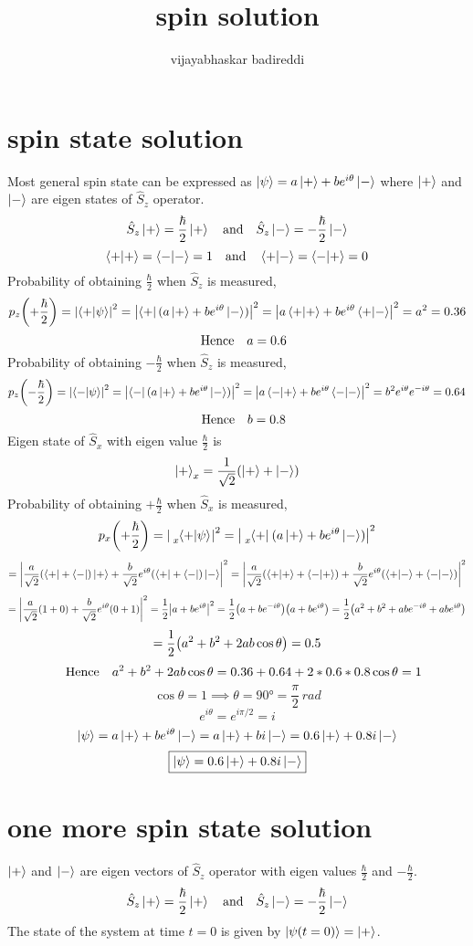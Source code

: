 \documentclass[12pt]{article}
\title{spin solution}
\author{vijayabhaskar badireddi}
\begin{document}
\section*{spin state solution}
Most general spin state can be expressed as $\ket{\psi}=a\ket{+}+be^{i\theta}\ket{-}$ where $\ket{+}$ and $\ket{-}$ are eigen states of $\hat{S}_z$ operator.
\[\hat{S}_z\ket{+}=\frac{\hbar}{2}\ket{+}\qq{and}\hat{S}_z\ket{-}=-\frac{\hbar}{2}\ket{-}\]
\[\braket{+}{+}=\braket{-}{-}=1\qq{and}\braket{+}{-}=\braket{-}{+}=0\]
Probability of obtaining $\frac{\hbar}{2}$ when $\hat{S}_z$ is measured, \[p_z\qty(+\frac{\hbar}{2})=\abs{\braket{+}{\psi}}^2=\abs{\bra{+}(a\ket{+}+be^{i\theta}\ket{-})}^2=\abs{a\braket{+}{+}+be^{i\theta}\braket{+}{-}}^2=a^2=0.36\]
\[\qq{Hence}a=0.6\]
Probability of obtaining $-\frac{\hbar}{2}$ when $\hat{S}_z$ is measured, \[p_z\qty(-\frac{\hbar}{2})=\abs{\braket{-}{\psi}}^2=\abs{\bra{-}(a\ket{+}+be^{i\theta}\ket{-})}^2=\abs{a\braket{-}{+}+be^{i\theta}\braket{-}{-}}^2=b^2e^{i\theta}e^{-i\theta}=0.64\]
\[\qq{Hence}b=0.8\]
Eigen state of $\hat{S}_x$ with eigen value $\frac{\hbar}{2}$ is \[\ket{+}_x=\frac{1}{\sqrt{2}}\qty(\ket{+}+\ket{-})\]
Probability of obtaining $+\frac{\hbar}{2}$ when $\hat{S}_x$ is measured, \[p_x\qty(+\frac{\hbar}{2})=\abs{\tensor*[_x]{\braket{+}{\psi}}{}}^2=\abs{\tensor[_x]{\bra{+}}{}(a\ket{+}+be^{i\theta}\ket{-})}^2\]
\[=\abs{\frac{a}{\sqrt{2}}\qty(\bra{+}+\bra{-})\ket{+}+\frac{b}{\sqrt{2}}e^{i\theta}\qty(\bra{+}+\bra{-})\ket{-}}^2=\abs{\frac{a}{\sqrt{2}}\qty(\braket{+}{+}+\braket{-}{+})+\frac{b}{\sqrt{2}}e^{i\theta}\qty(\braket{+}{-}+\braket{-}{-})}^2\]
\[=\abs{\frac{a}{\sqrt{2}}\qty(1+0)+\frac{b}{\sqrt{2}}e^{i\theta}\qty(0+1)}^2=\frac{1}{2}\abs{a+be^{i\theta}}^2=\frac{1}{2}\qty(a+be^{-i\theta})\qty(a+be^{i\theta})=\frac{1}{2}\qty(a^2+b^2+abe^{-i\theta}+abe^{i\theta})\]
\[=\frac{1}{2}\qty(a^2+b^2+2ab\cos\theta)=0.5\]
\[\qq{Hence}a^2+b^2+2ab\cos\theta=0.36+0.64+2*0.6*0.8\cos\theta=1\]
\[\cos\theta=1\implies\theta=\ang{90}=\frac{\pi}{2}\,rad\]
\[e^{i\theta}=e^{i\pi/2}=i\]
\[\ket{\psi}=a\ket{+}+be^{i\theta}\ket{-}=a\ket{+}+bi\ket{-}=0.6\ket{+}+0.8i\ket{-}\]
\[\boxed{\ket{\psi}=0.6\ket{+}+0.8i\ket{-}}\]
\section*{one more spin state solution}
$\ket{+}$ and $\ket{-}$ are eigen vectors of $\hat{S}_z$ operator with eigen values $\frac{\hbar}{2}$ and $-\frac{\hbar}{2}$.
\[\hat{S}_z\ket{+}=\frac{\hbar}{2}\ket{+}\qq{and}\hat{S}_z\ket{-}=-\frac{\hbar}{2}\ket{-}\]
The state of the system at time $t=0$ is given by $\ket{\psi(t=0)}=\ket{+}$.
\end{document}
